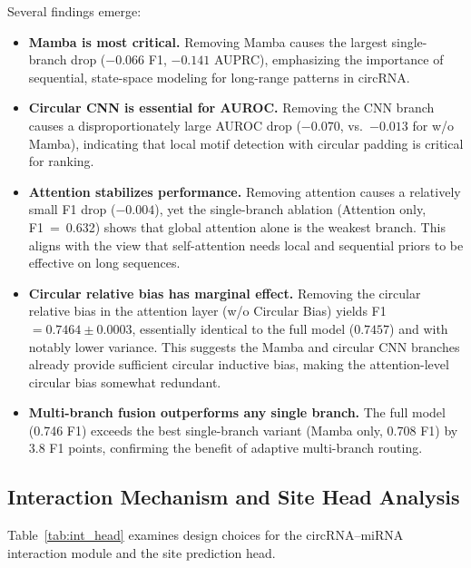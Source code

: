 \documentclass[11pt]{article}
\begin{document}
Several findings emerge:
\begin{itemize}[leftmargin=*]
  \item \textbf{Mamba is most critical.} Removing Mamba causes the largest
        single-branch drop ($-0.066$ F1, $-0.141$ AUPRC), emphasizing the
        importance of sequential, state-space modeling for long-range patterns
        in circRNA.
  \item \textbf{Circular CNN is essential for AUROC.}
        Removing the CNN branch causes a disproportionately large AUROC drop
        ($-0.070$, vs.~$-0.013$ for w/o Mamba), indicating that local motif
        detection with circular padding is critical for ranking.
  \item \textbf{Attention stabilizes performance.}
        Removing attention causes a relatively small F1 drop ($-0.004$),
        yet the single-branch ablation (Attention only, F1~=~0.632) shows
        that global attention alone is the weakest branch.
        This aligns with the view that self-attention needs local and
        sequential priors to be effective on long sequences.
  \item \textbf{Circular relative bias has marginal effect.}
        Removing the circular relative bias in the attention layer
        (w/o Circular Bias) yields F1~$= 0.7464 \pm 0.0003$, essentially
        identical to the full model ($0.7457$) and with notably lower variance.
        This suggests the Mamba and circular CNN branches already provide
        sufficient circular inductive bias, making the attention-level circular
        bias somewhat redundant.
  \item \textbf{Multi-branch fusion outperforms any single branch.}
        The full model (0.746 F1) exceeds the best single-branch variant
        (Mamba only, 0.708 F1) by 3.8 F1 points, confirming the benefit of
        adaptive multi-branch routing.
\end{itemize}


\subsection{Interaction Mechanism and Site Head Analysis}

Table~\ref{tab:int_head} examines design choices for the
circRNA--miRNA interaction module and the site prediction head.
\end{document}
